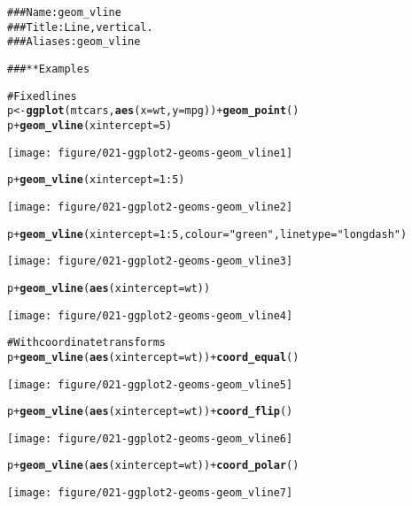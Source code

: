 \documentclass[a4paper,titlepage]{tufte-handout}\usepackage{graphicx, color}
\makeatletter
\def\maxwidth{ %
  \ifdim\Gin@nat@width>\linewidth
    \linewidth
  \else
    \Gin@nat@width
  \fi
}
\newcommand{\hlfunctioncall}[1]{\textcolor[rgb]{0.501960784313725,0,0.329411764705882}{\textbf{#1}}}%
\newcommand{\hlstring}[1]{\textcolor[rgb]{0.6,0.6,1}{#1}}%
\newcommand{\hlcomment}[1]{\textcolor[rgb]{0.180392156862745,0.6,0.341176470588235}{#1}}%
\newenvironment{kframe}{%
 \def\at@end@of@kframe{}%
 \ifinner\ifhmode%
  \def\at@end@of@kframe{\end{minipage}}%
  \begin{minipage}{\columnwidth}%
 \fi\fi%
 \def\FrameCommand##1{\hskip\@totalleftmargin \hskip-\fboxsep
 \colorbox{shadecolor}{##1}\hskip-\fboxsep
     \hskip-\linewidth \hskip-\@totalleftmargin \hskip\columnwidth}%
 \MakeFramed {\advance\hsize-\width
   \@totalleftmargin\z@ \linewidth\hsize
   \@setminipage}}%
 {\par\unskip\endMakeFramed%
 \at@end@of@kframe}
\newenvironment{knitrout}{}{} %
\makeatother
\begin{document}
\begin{knitrout}
\color{fgcolor}\begin{kframe}
\begin{alltt}
\hlcomment{### Name: geom_vline}
\hlcomment{### Title: Line, vertical.}
\hlcomment{### Aliases: geom_vline}

\hlcomment{### ** Examples}

\hlcomment{# Fixed lines}
p <- \hlfunctioncall{ggplot}(mtcars, \hlfunctioncall{aes}(x = wt, y = mpg)) + \hlfunctioncall{geom_point}()
p + \hlfunctioncall{geom_vline}(xintercept = 5)
\end{alltt}
\end{kframe}
\texttt{[image: figure/021-ggplot2-geoms-geom\_vline1]} 
\begin{kframe}\begin{alltt}
p + \hlfunctioncall{geom_vline}(xintercept = 1:5)
\end{alltt}
\end{kframe}
\texttt{[image: figure/021-ggplot2-geoms-geom\_vline2]} 
\begin{kframe}\begin{alltt}
p + \hlfunctioncall{geom_vline}(xintercept = 1:5, colour=\hlstring{"green"}, linetype = \hlstring{"longdash"})
\end{alltt}
\end{kframe}
\texttt{[image: figure/021-ggplot2-geoms-geom\_vline3]} 
\begin{kframe}\begin{alltt}
p + \hlfunctioncall{geom_vline}(\hlfunctioncall{aes}(xintercept = wt))
\end{alltt}
\end{kframe}
\texttt{[image: figure/021-ggplot2-geoms-geom\_vline4]} 
\begin{kframe}\begin{alltt}

\hlcomment{# With coordinate transforms}
p + \hlfunctioncall{geom_vline}(\hlfunctioncall{aes}(xintercept = wt)) + \hlfunctioncall{coord_equal}()
\end{alltt}
\end{kframe}
\texttt{[image: figure/021-ggplot2-geoms-geom\_vline5]} 
\begin{kframe}\begin{alltt}
p + \hlfunctioncall{geom_vline}(\hlfunctioncall{aes}(xintercept = wt)) + \hlfunctioncall{coord_flip}()
\end{alltt}
\end{kframe}
\texttt{[image: figure/021-ggplot2-geoms-geom\_vline6]} 
\begin{kframe}\begin{alltt}
p + \hlfunctioncall{geom_vline}(\hlfunctioncall{aes}(xintercept = wt)) + \hlfunctioncall{coord_polar}()
\end{alltt}
\end{kframe}
\texttt{[image: figure/021-ggplot2-geoms-geom\_vline7]} 
\begin{kframe}\begin{alltt}


\end{alltt}
\end{kframe}
\end{knitrout}
\end{document}
